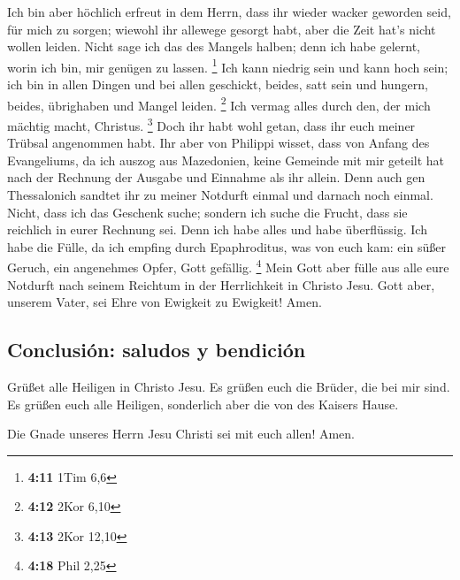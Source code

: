  Ich bin aber höchlich erfreut in dem Herrn, dass ihr
wieder wacker geworden seid, für mich zu sorgen; wiewohl ihr allewege
gesorgt habt, aber die Zeit hat's nicht wollen leiden. 
Nicht sage ich das des Mangels halben; denn ich habe gelernt, worin ich
bin, mir genügen zu lassen. \footnote{\textbf{4:11} 1Tim 6,6}
 Ich kann niedrig sein und kann hoch sein; ich bin in
allen Dingen und bei allen geschickt, beides, satt sein und hungern,
beides, übrighaben und Mangel leiden. \footnote{\textbf{4:12} 2Kor 6,10}
 Ich vermag alles durch den, der mich mächtig macht,
Christus. \footnote{\textbf{4:13} 2Kor 12,10}  Doch ihr
habt wohl getan, dass ihr euch meiner Trübsal angenommen habt.
 Ihr aber von Philippi wisset, dass von Anfang des
Evangeliums, da ich auszog aus Mazedonien, keine Gemeinde mit mir
geteilt hat nach der Rechnung der Ausgabe und Einnahme als ihr allein.
 Denn auch gen Thessalonich sandtet ihr zu meiner
Notdurft einmal und darnach noch einmal.  Nicht, dass ich
das Geschenk suche; sondern ich suche die Frucht, dass sie reichlich in
eurer Rechnung sei.  Denn ich habe alles und habe
überflüssig. Ich habe die Fülle, da ich empfing durch Epaphroditus, was
von euch kam: ein süßer Geruch, ein angenehmes Opfer, Gott gefällig.
\footnote{\textbf{4:18} Phil 2,25}  Mein Gott aber fülle
aus alle eure Notdurft nach seinem Reichtum in der Herrlichkeit in
Christo Jesu.  Gott aber, unserem Vater, sei Ehre von
Ewigkeit zu Ewigkeit! Amen.

\hypertarget{conclusiuxf3n-saludos-y-bendiciuxf3n}{%
\subsection{Conclusión: saludos y
bendición}\label{conclusiuxf3n-saludos-y-bendiciuxf3n}}

 Grüßet alle Heiligen in Christo Jesu. Es grüßen euch die
Brüder, die bei mir sind.  Es grüßen euch alle Heiligen,
sonderlich aber die von des Kaisers Hause.

 Die Gnade unseres Herrn Jesu Christi sei mit euch allen!
Amen.
